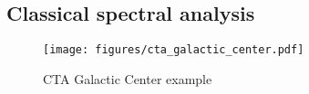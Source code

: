 \subsection{Classical spectral analysis}
\label{ssec:1D-analysis}

\begin{figure*}[t]
	\centering
	\texttt{[image: figures/cta\_galactic\_center.pdf]}
	\caption{CTA Galactic Center example}
	\label{fig:cta_galactic_center}
\end{figure*}

